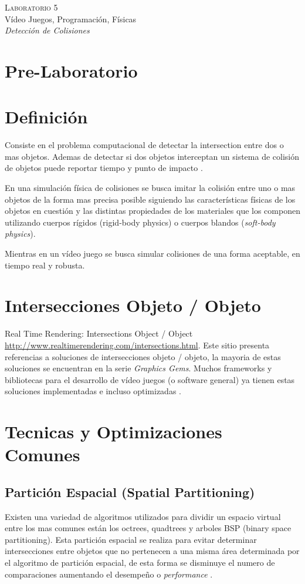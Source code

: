 \begin{center}
\textsc{\Large Laboratorio 5}~\\
{\large Vídeo Juegos, Programación, Físicas}~\\
\emph{Detección de Colisiones}
\end{center}


\section{Pre-Laboratorio}

\section{Definición}
Consiste en el problema computacional de detectar la intersection entre dos o mas objetos. Ademas de detectar si dos objetos interceptan un sistema de colisión de objetos puede reportar tiempo y punto de impacto \cite{ericson_collision}.

En una simulación física de colisiones se busca imitar la colisión entre uno o mas objetos de la forma mas precisa posible siguiendo las características físicas de los objetos en cuestión y las distintas propiedades de los materiales que los componen utilizando cuerpos rígidos (rigid-body physics) o cuerpos blandos (\emph{soft-body physics}).

Mientras en un vídeo juego se busca simular colisiones de una forma aceptable, en tiempo real y robusta.

\section{Intersecciones Objeto / Objeto}
Real Time Rendering: Intersections Object / Object \url{http://www.realtimerendering.com/intersections.html}. Este sitio presenta referencias a soluciones de intersecciones objeto / objeto, la mayoria de estas soluciones se encuentran en la serie \emph{Graphics Gems}. Muchos frameworks y bibliotecas para el desarrollo de vídeo juegos (o software general) ya tienen estas soluciones implementadas e incluso optimizadas \cite{rtr_intersections}.
\section{Tecnicas y Optimizaciones Comunes}
\subsection{Partición Espacial (Spatial Partitioning)}
Existen una variedad de algoritmos utilizados para dividir un espacio virtual entre los mas comunes están los octrees, quadtrees y arboles BSP (binary space partitioning). Esta partición espacial se realiza para evitar determinar intersecciones entre objetos que no pertenecen a una misma área determinada por el algoritmo de partición espacial, de esta forma se disminuye el numero de comparaciones aumentando el desempeño o \emph{performance} \cite{sp_partition}.
